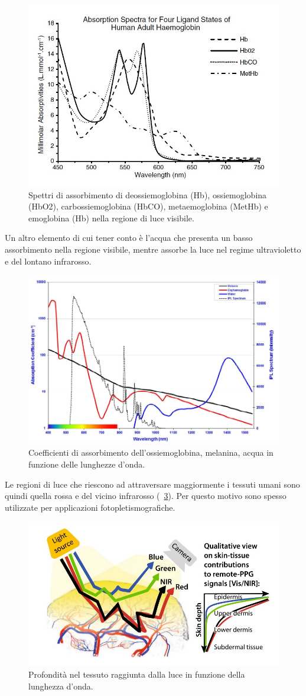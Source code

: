 \begin{figure}[h]
	\centering
	\includegraphics[width=0.5\linewidth]{ImageFiles/Fotopletismografia/AssorbimentoEmolglobina}
	\caption{Spettri di assorbimento di deossiemoglobina (Hb), ossiemoglobina (HbO2), carbossiemoglobina (HbCO), metaemoglobina (MetHb) e emoglobina (Hb) nella regione di luce visibile.}
	\label{fig:AssorbimentoEmolglobina}
\end{figure}
Un altro elemento di cui tener conto è l'acqua che presenta un basso assorbimento nella regione visibile, mentre assorbe la luce nel regime ultravioletto e del lontano infrarosso. 
\begin{figure}[h]
	\centering
	\includegraphics[width=0.6\linewidth]{ImageFiles/Fotopletismografia/PicchiAssorbimento}
	\caption{Coefficienti di assorbimento dell'ossiemoglobina, melanina, acqua in funzione delle lunghezze d'onda.}
	\label{fig:PicchiAssorbimento}
\end{figure}
Le regioni di luce che riescono ad attraversare maggiormente i tessuti umani sono quindi quella rossa e del vicino infrarosso (\Fig~\ref{fig:PenetrazioneLuce}). Per questo motivo sono spesso utilizzate per applicazioni fotopletismografiche.
\begin{figure}[h]
	\centering
	\includegraphics[width=0.6\linewidth]{ImageFiles/Fotopletismografia/PenetrazioneLuce}
	\caption{Profondità nel tessuto raggiunta dalla luce in funzione della lunghezza d'onda.}
	\label{fig:PenetrazioneLuce}
\end{figure}
